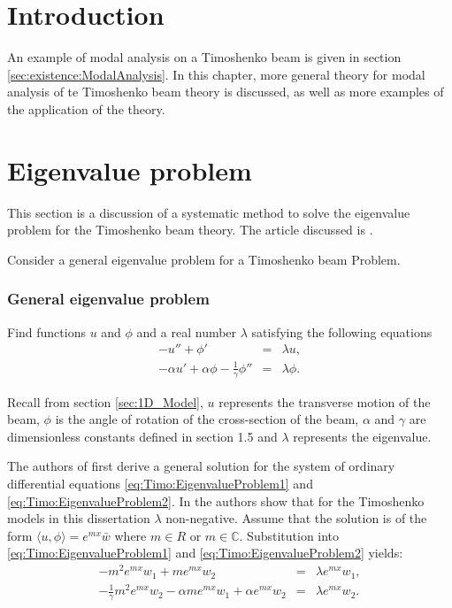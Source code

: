 \documentclass[../../main.tex]{subfiles}
\begin{document}
\section{Introduction}
An example of modal analysis on a Timoshenko beam is given in section \ref{sec:existence:ModalAnalysis}. In this chapter, more general theory for modal analysis of te Timoshenko beam theory is discussed, as well as more examples of the application of the theory.

\section{Eigenvalue problem}\label{sec:Timo:EigenvalueProblem}
This section is a discussion of a systematic method to solve the eigenvalue problem for the Timoshenko beam theory. The article discussed is \cite{VV06}.

Consider a general eigenvalue problem for a Timoshenko beam Problem.
\subsubsection{General eigenvalue problem} \label{sssec:Timo:EigenvalueProblem}
Find functions $u$ and $\phi$ and a real number $\lambda$ satisfying the following equations
\begin{eqnarray}
-u'' + \phi' &=& \lambda u, \label{eq:Timo:EigenvalueProblem1}\\
-\alpha u' + \alpha\phi - \frac{1}{\gamma}\phi'' &=& \lambda\phi.\label{eq:Timo:EigenvalueProblem2}
\end{eqnarray}

Recall from section \ref{sec:1D_Model}, $u$ represents the transverse motion of the beam, $\phi$ is the angle of rotation of the cross-section of the beam, $\alpha$ and $\gamma$ are dimensionless constants defined in section 1.5 and $\lambda$ represents the eigenvalue. 

The authors of \cite{VV06} first derive a general solution for the system of ordinary differential equations \eqref{eq:Timo:EigenvalueProblem1} and \eqref{eq:Timo:EigenvalueProblem2}. In \cite{VV06} the authors show that for the Timoshenko models in this dissertation $\lambda$ non-negative. Assume that the solution is of the form $\langle u, \phi \rangle = e^{mx}\bar{w}$ where $m\in R$ or $m\in \mathbb{C}$. Substitution into \eqref{eq:Timo:EigenvalueProblem1} and \eqref{eq:Timo:EigenvalueProblem2} yields:
\begin{eqnarray*}
-m^{2}e^{mx}w_{1}+me^{mx}w_{2}&=&\lambda e^{mx}w_{1},\\
-\frac{1}{\gamma}m^{2}e^{mx}w_{2}-\alpha me^{mx}w_{1}+\alpha e^{mx}w_{2}&=&\lambda e^{mx}w_{2}.
\end{eqnarray*}
\end{document}
